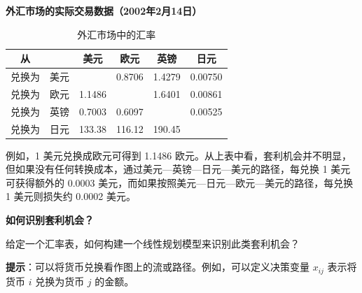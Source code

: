 \documentclass[12pt,a4paper]{article}
\begin{document}
\textbf{外汇市场的实际交易数据（2002年2月14日）}

\begin{table}[ht]
	\caption{外汇市场中的汇率} 
	\centering 
	\begin{tabular}{c c c c c c} 
    \hline\hline
		从 & & 美元 & 欧元 & 英镑 & 日元\\ 
        \hline
		兑换为 & 美元 &        & 0.8706 & 1.4279 & 0.00750 \\ 
		兑换为 & 欧元 & 1.1486 &        & 1.6401 & 0.00861 \\
		兑换为 & 英镑 & 0.7003 & 0.6097 &        & 0.00525 \\
		兑换为 & 日元 & 133.38 & 116.12 & 190.45 &         \\ \hline\hline
	\end{tabular}
	\label{table:exchange} 
\end{table}

例如，1 美元兑换成欧元可得到 1.1486 欧元。从上表中看，套利机会并不明显，但如果没有任何转换成本，通过美元—英镑—日元—美元的路径，每兑换 1 美元可获得额外的 0.0003 美元，而如果按照美元—日元—欧元—美元的路径，每兑换 1 美元则损失约 0.0002 美元。

\textbf{如何识别套利机会？}

给定一个汇率表，如何构建一个线性规划模型来识别此类套利机会？

\textbf{提示}：可以将货币兑换看作图上的流或路径。例如，可以定义决策变量 \( x_{ij} \) 表示将货币 \( i \) 兑换为货币 \( j \) 的金额。
 
\end{document}
